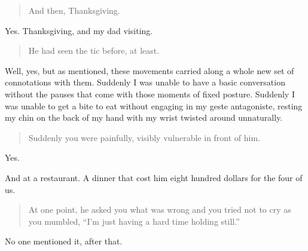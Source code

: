 \begin{quote}
And then, Thanksgiving.
\end{quote}

Yes. Thanksgiving, and my dad visiting.

\begin{quote}
He had seen the tic before, at least.
\end{quote}

Well, yes, but as mentioned, these movements carried along a whole new set of connotations with them. Suddenly I was unable to have a basic conversation without the pauses that come with those moments of fixed posture. Suddenly I was unable to get a bite to eat without engaging in my geste antagoniste, resting my chin on the back of my hand with my wrist twisted around unnaturally.

\begin{quote}
Suddenly you were painfully, visibly vulnerable in front of him.
\end{quote}

Yes.

And at a restaurant. A dinner that cost him eight hundred dollars for the four of us.

\begin{quote}
At one point, he asked you what was wrong and you tried not to cry as you mumbled, ``I'm just having a hard time holding still.''
\end{quote}

No one mentioned it, after that.
